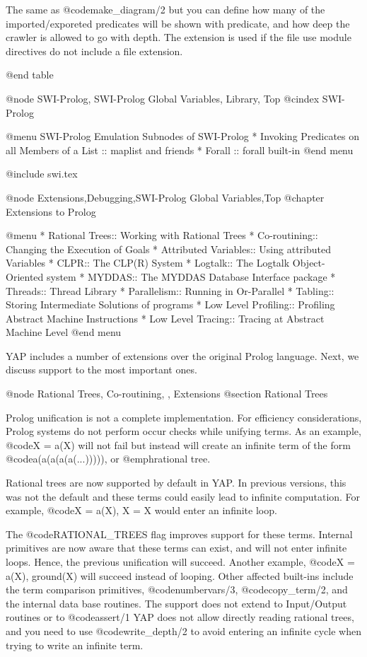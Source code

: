 The same as @code{make_diagram/2} but you can define how many of the imported/exporeted predicates will be shown with predicate, and how deep the crawler is allowed to go with depth. The extension is used if the file use module directives do not include a file extension.

@end table


@node SWI-Prolog, SWI-Prolog Global Variables, Library, Top
@cindex SWI-Prolog

@menu SWI-Prolog Emulation
Subnodes of SWI-Prolog
* Invoking Predicates on all Members of a List :: maplist and friends
* Forall :: forall built-in
@end menu

@include swi.tex

@node Extensions,Debugging,SWI-Prolog Global Variables,Top 
@chapter Extensions to Prolog

@menu
* Rational Trees:: Working with Rational Trees
* Co-routining:: Changing the Execution of Goals
* Attributed Variables:: Using attributed Variables
* CLPR:: The CLP(R) System
* Logtalk:: The Logtalk Object-Oriented system
* MYDDAS:: The MYDDAS Database Interface package
* Threads:: Thread Library
* Parallelism:: Running in Or-Parallel
* Tabling:: Storing Intermediate Solutions of programs 
* Low Level Profiling:: Profiling Abstract Machine Instructions
* Low Level Tracing:: Tracing at Abstract Machine Level
@end menu

YAP includes a number of extensions over the original Prolog
language. Next, we discuss support to the most important ones.

@node Rational Trees, Co-routining, , Extensions
@section Rational Trees

Prolog unification is not a complete implementation. For efficiency
considerations, Prolog systems do not perform occur checks while
unifying terms. As an example, @code{X = a(X)} will not fail but instead
will create an infinite term of the form @code{a(a(a(a(a(...)))))}, or
@emph{rational tree}.

Rational trees are now supported by default in YAP. In previous
versions, this was not the default and these terms could easily lead
to infinite computation. For example, @code{X = a(X), X = X} would
enter an infinite loop.

The @code{RATIONAL_TREES} flag improves support for these
terms. Internal primitives are now aware that these terms can exist, and
will not enter infinite loops. Hence, the previous unification will
succeed. Another example, @code{X = a(X), ground(X)} will succeed
instead of looping. Other affected built-ins include the term comparison
primitives, @code{numbervars/3}, @code{copy_term/2}, and the internal
data base routines. The support does not extend to Input/Output routines
or to @code{assert/1} YAP does not allow directly reading
rational trees, and you need to use @code{write_depth/2} to avoid
entering an infinite cycle when trying to write an infinite term.

